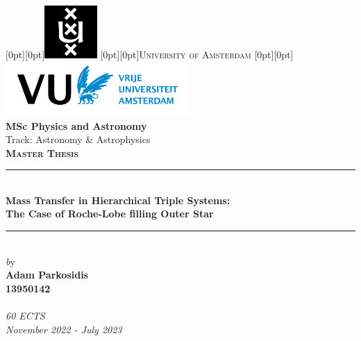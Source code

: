 \begin{titlepage}

\newcommand{\HRule}{\rule{\linewidth}{0.8mm}}
\center
 \vspace*{0.5cm}  %
\raisebox{0.05cm}[0pt][0pt]{\includegraphics[width=2.0cm]{Thesis/logos/UvA_logo.png}}
\raisebox{0.7cm}[0pt][0pt]{\textsc{\Huge University of Amsterdam}}
\raisebox{-1.85cm}[0pt][0pt]{\includegraphics[width=7.0cm]{Thesis/logos/VUlogo.png}}\\[2.0 cm]

\Large{\textbf{MSc Physics and Astronomy}}\\%
\Large{Track: Astronomy \& Astrophysics}\\[0.7cm] %
\textsc{\Large \textbf{Master Thesis}}\\[0.2cm]


\HRule \\[0.3cm]

{ \huge \bfseries Mass Transfer in Hierarchical Triple Systems:
}\\[0.8cm] %
{\Large \bfseries The Case of Roche-Lobe filling Outer Star} %

\HRule \\[0.7cm]
 

{\Large \emph by}\\[0.6cm]
{\Large \bfseries Adam Parkosidis\\ %
13950142}\\[0.4cm] %
{\large  \monthyeardate{\today}}\\ %
{\large  \emph{60 ECTS}}\\ %
{\large  \emph{November 2022 - July 2023}}\\[1.8cm] %


\end{titlepage}
